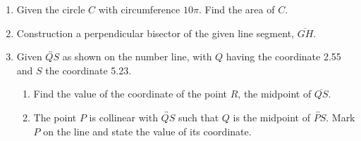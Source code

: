 \documentclass[12pt, oneside]{article}
\begin{document}
\begin{enumerate}
\newpage
  \item Given the circle $C$ with circumference $10\pi$. Find the area of $C$. \vspace{5cm}

  \item Construction a perpendicular bisector of the given line segment, $\overline{GH}$.\\
    \vspace{4cm}
    \begin{center}
    \end{center}

\newpage
  \item Given $\overleftrightarrow{QS}$ as shown on the number line, with $Q$ having the coordinate 2.55 and $S$ the coordinate 5.23. \\[10pt] %
     \bigskip
    \begin{enumerate}
      \item Find the value of the coordinate of the point $R$, the midpoint of $\overline{QS}$. \vspace{4cm}
      \item The point $P$ is collinear with $\overleftrightarrow{QS}$ such that $Q$ is the midpoint of $\overleftrightarrow{PS}$. Mark $P$ on the line and state the value of its coordinate.
    \end{enumerate}\vspace{4cm}


\end{enumerate}
\end{document}
